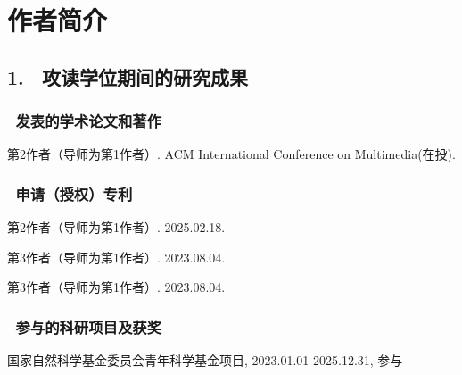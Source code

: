 

\specialsectioning


\chapter{作者简介}
\thispagestyle{others}
\pagestyle{others}
\xiaosi



\section{1. \ 攻读学位期间的研究成果}
\subsection{ \ 发表的学术论文和著作 }
\noindent [1]
\begin{minipage}[t]{0.96\linewidth}
第2作者（导师为第1作者）. ACM International Conference on Multimedia(在投).
\end{minipage}
\vspace{0cm}

\subsection{ \ 申请（授权）专利}
\noindent [1]
\begin{minipage}[t]{0.96\linewidth}
    第2作者（导师为第1作者）. 2025.02.18.
\end{minipage}

\noindent [2]
\begin{minipage}[t]{0.96\linewidth}
    第3作者（导师为第1作者）. 2023.08.04.
\end{minipage}

\noindent [3]
\begin{minipage}[t]{0.96\linewidth}
    第3作者（导师为第1作者）. 2023.08.04.
\end{minipage}

\subsection{ \ 参与的科研项目及获奖}
\noindent [1]
\begin{minipage}[t]{0.96\linewidth}
    国家自然科学基金委员会青年科学基金项目, 2023.01.01-2025.12.31, 参与
\end{minipage}
